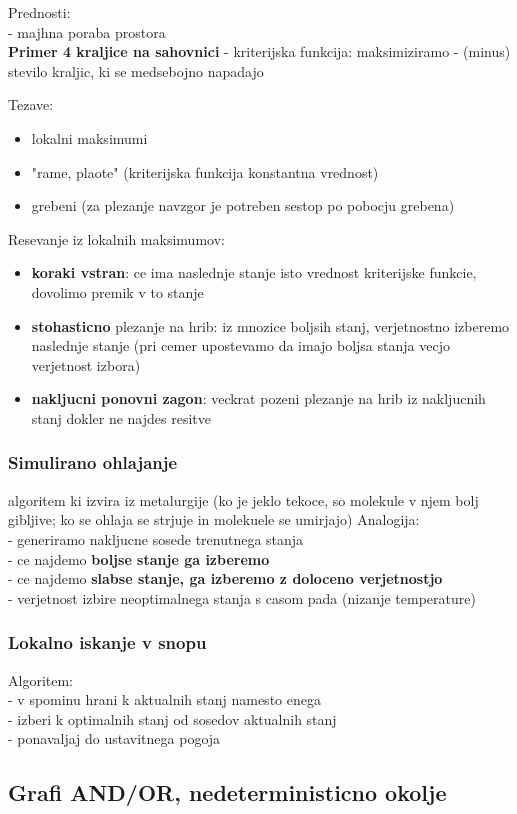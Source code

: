 Prednosti:\\
- majhna poraba prostora\\

\textbf{Primer 4 kraljice na sahovnici}
- kriterijska funkcija: maksimiziramo - (minus) stevilo kraljic, ki se medsebojno napadajo

Tezave:
\begin{itemize}[noitemsep,topsep=0pt,leftmargin=*]
    \item lokalni maksimumi
    \item "rame, plaote" (kriterijska funkcija konstantna vrednost)
    \item grebeni (za plezanje navzgor je potreben sestop po pobocju grebena)
\end{itemize}

Resevanje iz lokalnih maksimumov:
\begin{itemize}[noitemsep,topsep=0pt,leftmargin=*]
    \item \textbf{koraki vstran}: ce ima naslednje stanje isto vrednost kriterijske funkcie, dovolimo premik v to stanje
    \item \textbf{stohasticno} plezanje na hrib: iz mnozice boljsih stanj, verjetnostno izberemo naslednje stanje (pri cemer upostevamo da imajo boljsa stanja vecjo verjetnost izbora)
    \item \textbf{nakljucni ponovni zagon}: veckrat pozeni plezanje na hrib iz nakljucnih stanj dokler ne najdes resitve
\end{itemize}

\subsubsection{Simulirano ohlajanje}
algoritem ki izvira iz metalurgije (ko je jeklo tekoce, so molekule v njem bolj gibljive; ko se ohlaja se strjuje in molekuele se umirjajo)
Analogija:\\
- generiramo nakljucne sosede trenutnega stanja\\
- ce najdemo \textbf{boljse stanje ga izberemo}\\
- ce najdemo \textbf{slabse stanje, ga izberemo z doloceno verjetnostjo}\\
- verjetnost izbire neoptimalnega stanja s casom pada (nizanje temperature)

\subsubsection{Lokalno iskanje v snopu}
Algoritem:\\
- v spominu hrani k aktualnih stanj namesto enega\\
- izberi k optimalnih stanj od sosedov aktualnih stanj\\
- ponavaljaj do ustavitnega pogoja 

\subsection{Grafi AND/OR, nedeterministicno okolje}